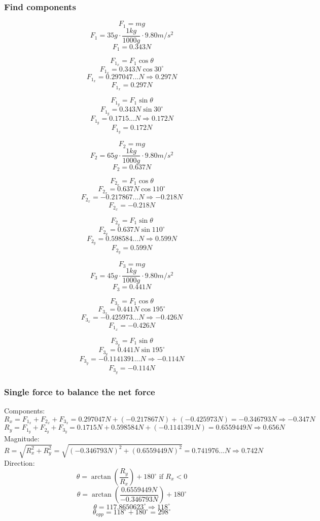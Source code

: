 \documentclass[11pt, letterpaper, includehead]{article}
\begin{document}
\subsubsection{Find components} %
\begin{multicols}{3}
  $$F_1 = mg$$
  $$F_1 = 35g \cdot \frac{1kg}{1000g} \cdot 9.80m/s^2$$
  $$F_1 = 0.343N$$

  $$F_{1_x} = F_1\cos\theta$$
  $$F_{1_x} = 0.343N\cos30^{\circ}$$
  $$F_{1_x} = 0.297047...N \Rightarrow 0.297N$$
  $$\boxed{F_{1_x} = 0.297N}$$

  $$F_{1_y} = F_1\sin\theta$$
  $$F_{1_y} = 0.343N\sin30^{\circ}$$
  $$F_{1_y} = 0.1715...N \Rightarrow 0.172N$$
  $$\boxed{F_{1_y} = 0.172N}$$

  \columnbreak
  $$F_2 = mg$$
  $$F_2 = 65g \cdot \frac{1kg}{1000g} \cdot 9.80m/s^2$$
  $$F_2 = 0.637N$$

  $$F_{2_x} = F_1\cos\theta$$
  $$F_{2_x} = 0.637N\cos110^{\circ}$$
  $$F_{2_x} = -0.217867...N \Rightarrow -0.218N$$
  $$\boxed{F_{2_x} = -0.218N}$$

  $$F_{2_y} = F_1\sin\theta$$
  $$F_{2_y} = 0.637N\sin110^{\circ}$$
  $$F_{2_y} = 0.598584...N \Rightarrow 0.599N$$
  $$\boxed{F_{2_y} = 0.599N}$$

  \columnbreak
  $$F_3 = mg$$
  $$F_3 = 45g \cdot \frac{1kg}{1000g} \cdot 9.80m/s^2$$
  $$F_3 = 0.441N$$

  $$F_{3_x} = F_1\cos\theta$$
  $$F_{3_x} = 0.441N\cos195^{\circ}$$
  $$F_{3_x} = -0.425973...N \Rightarrow -0.426N$$
  $$\boxed{F_{1_x} = -0.426N}$$

  $$F_{3_y} = F_1\sin\theta$$
  $$F_{3_y} = 0.441N\sin195^{\circ}$$
  $$F_{3_y} = -0.1141391...N \Rightarrow -0.114N$$
  $$\boxed{F_{3_y} = -0.114N}$$
 
\end{multicols}

\subsubsection{Single force to balance the net force} %
Components:
$$R_x = F_{1_x} + F_{2_x} + F_{3_x} = 0.297047N + (-0.217867N) + (-0.425973N) = -0.346793N \Rightarrow \boxed{-0.347N} $$
$$R_y = F_{1_y} + F_{2_y} + F_{3_y} = 0.1715N + 0.598584N + (-0.1141391N) = 0.6559449N \Rightarrow \boxed{0.656N} $$
Magnitude:
$$R = \sqrt{R_x^2 + R_y^2} = \sqrt{(-0.346793N)^2 + (0.6559449N)^2} = 0.741976...N \Rightarrow \boxed{0.742N}$$
Direction:
$$\theta = \arctan \left( \frac{R_y}{R_x} \right) + 180^{\circ} \text{ if } R_x < 0$$
$$\theta = \arctan \left( \frac{0.6559449N}{-0.346793N} \right) + 180^{\circ}$$
$$\theta = 117.8650623^{\circ} \Rightarrow {118^{\circ}}$$
$$\theta_{opp} = 118^{\circ} + 180^{\circ} = \boxed{298^{\circ}}$$
\end{document}
